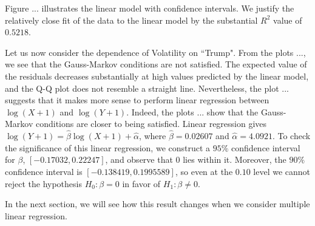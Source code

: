 \documentclass[../main.tex]{subfiles}
\begin{document}
Figure ... illustrates the linear model with confidence intervals. We justify the relatively close fit of the data to the linear model by the substantial $R^2$ value of $0.5218$.

Let us now consider the dependence of Volatility on ``Trump". From the plots ..., we see that the Gauss-Markov conditions are not satisfied. The expected value of the residuals decreases substantially at high values predicted by the linear model, and the Q-Q plot does not resemble a straight line. Nevertheless, the plot ... suggests that it makes more sense to perform linear regression between $\log(X + 1)$ and $\log(Y + 1)$.
Indeed, the plots ... show that the Gauss-Markov conditions are closer to being satisfied.
Linear regression gives $\log(Y + 1) = \hat{\beta} \log(X + 1) + \hat{\alpha}$, where $\hat{\beta} = 0.02607$ and $\hat{\alpha} = 4.0921$.
To check the significance of this linear regression, we construct a $95\%$ confidence interval for $\beta$, $[-0.17032, 0.22247]$, and observe that $0$ lies within it. Moreover, the $90\%$ confidence interval is $[-0.138419, 0.1995589]$, so even at the $0.10$ level we cannot reject the hypothesis $H_0: \beta = 0$ in favor of $H_1: \beta \ne 0$.

In the next section, we will see how this result changes when we consider multiple linear regression.
\end{document}
